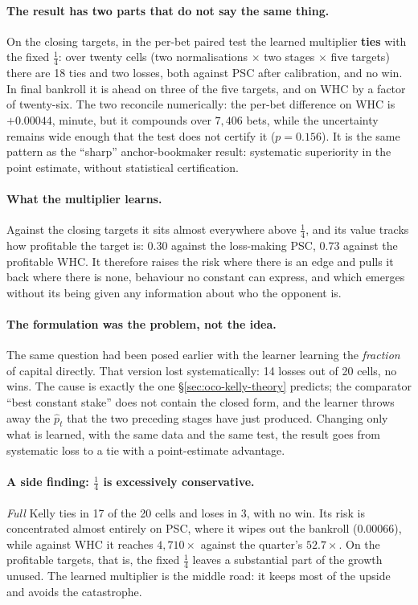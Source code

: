 \documentclass[12pt,a4paper,oneside]{report}
\renewcommand{\_}{\oldunderscore\allowbreak}
\theoremstyle{definition}
\theoremstyle{plain}
\theoremstyle{definition}   %
\begin{document}
\paragraph{The result has two parts that do not say the same thing.} On the closing targets, in
the per-bet paired test the learned multiplier \textbf{ties} with the fixed $\tfrac14$: over
twenty cells (two normalisations $\times$ two stages $\times$ five targets) there are 18 ties and
two losses, both against PSC after calibration, and no win. In final bankroll it is ahead on three
of the five targets, and on WHC by a factor of twenty-six. The two reconcile numerically: the
per-bet difference on WHC is $+0.00044$, minute, but it compounds over $7{,}406$ bets, while the
uncertainty remains wide enough that the test does not certify it ($p=0.156$). It is the same pattern as the ``sharp'' anchor-bookmaker result:
systematic superiority in the point estimate, without statistical certification.

\paragraph{What the multiplier learns.} Against the closing targets it sits almost everywhere
above $\tfrac14$, and its value tracks how profitable the target is: $0.30$ against the
loss-making PSC, $0.73$ against the profitable WHC. It therefore raises the risk where there is an edge and pulls it back where there
is none, behaviour no constant can express, and which emerges without its being given any
information about who the opponent is.

\paragraph{The formulation was the problem, not the idea.} The same question had been posed
earlier with the learner learning the \emph{fraction} of capital directly. That version lost
systematically: 14 losses out of 20 cells, no wins. The cause is exactly the one
\S\ref{sec:oco-kelly-theory} predicts; the comparator ``best constant stake'' does not contain
the closed form, and the learner throws away the $\hat{p}_t$ that the two preceding stages have
just produced. Changing only what is learned, with the same data and the same test, the result
goes from systematic loss to a tie with a point-estimate advantage.

\paragraph{A side finding: $\tfrac14$ is excessively conservative.} \emph{Full} Kelly ties in 17 of
the 20 cells and loses in 3, with no win. Its risk is concentrated almost entirely on PSC, where it
wipes out the bankroll ($0.00066$), while against WHC it reaches $4{,}710\times$ against the
quarter's $52.7\times$. On the profitable targets, that is, the fixed
$\tfrac14$ leaves a substantial part of the growth unused. The learned multiplier is the middle
road: it keeps most of the upside and avoids the catastrophe.
\end{document}

